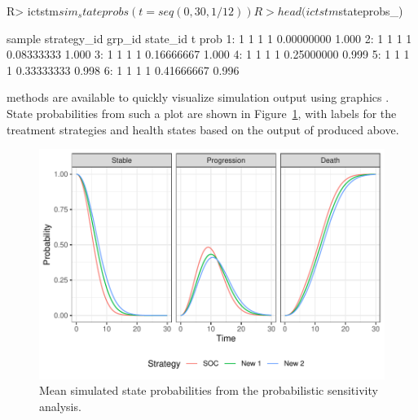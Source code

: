 \documentclass[article, nojss]{jss}\usepackage[]{graphicx}\usepackage[]{color}
\begin{document}
\begin{Schunk}
\begin{Sinput}
R> ictstm$sim_stateprobs(t = seq(0, 30 , 1/12))
R> head(ictstm$stateprobs_)
\end{Sinput}
\begin{Soutput}
   sample strategy_id grp_id state_id          t  prob
1:      1           1      1        1 0.00000000 1.000
2:      1           1      1        1 0.08333333 1.000
3:      1           1      1        1 0.16666667 1.000
4:      1           1      1        1 0.25000000 0.999
5:      1           1      1        1 0.33333333 0.998
6:      1           1      1        1 0.41666667 0.996
\end{Soutput}
\end{Schunk}

 methods are available to quickly visualize simulation output using  graphics \citep{wickham2016ggplot2}. State probabilities from such a plot are shown in Figure~\ref{fig:ictstm-stprobs}, with labels for the treatment strategies and health states based on the output of  produced above.

\begin{Schunk}
\end{Schunk}

\begin{figure}[h]
\centering
\includegraphics{figure/ictstm_plot_stateprobs-1.pdf}
\caption{Mean simulated state probabilities from the probabilistic sensitivity analysis.} \label{fig:ictstm-stprobs}
\end{figure}
\end{document}
